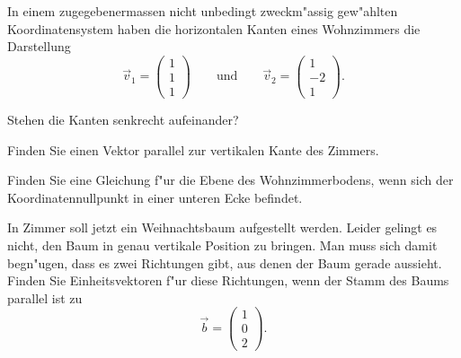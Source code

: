 In einem zugegebenermassen nicht unbedingt zweckm"assig gew"ahlten
Koordinatensystem haben die horizontalen Kanten eines Wohnzimmers
die Darstellung
\[
\vec v_1=\begin{pmatrix}
1\\1\\1
\end{pmatrix}
\qquad\text{und}\qquad
\vec v_2=\begin{pmatrix}
1\\-2\\1
\end{pmatrix}.
\]
\begin{teilaufgaben}
\item Stehen die Kanten senkrecht aufeinander?
\item Finden Sie einen Vektor parallel zur vertikalen Kante
des Zimmers.
\item Finden Sie eine Gleichung f"ur die Ebene des Wohnzimmerbodens, wenn
sich der Koordinatennullpunkt in einer unteren Ecke befindet.
\item In Zimmer soll jetzt ein Weihnachtsbaum aufgestellt werden.
Leider gelingt es nicht, den Baum in genau vertikale Position zu
bringen. Man muss sich damit begn"ugen, dass es zwei Richtungen
gibt, aus denen der Baum gerade aussieht. Finden Sie Einheitsvektoren
f"ur diese Richtungen,
wenn der Stamm des Baums parallel ist zu
\[
\vec b=\begin{pmatrix}
1\\0\\2
\end{pmatrix}.
\]
\end{teilaufgaben}

